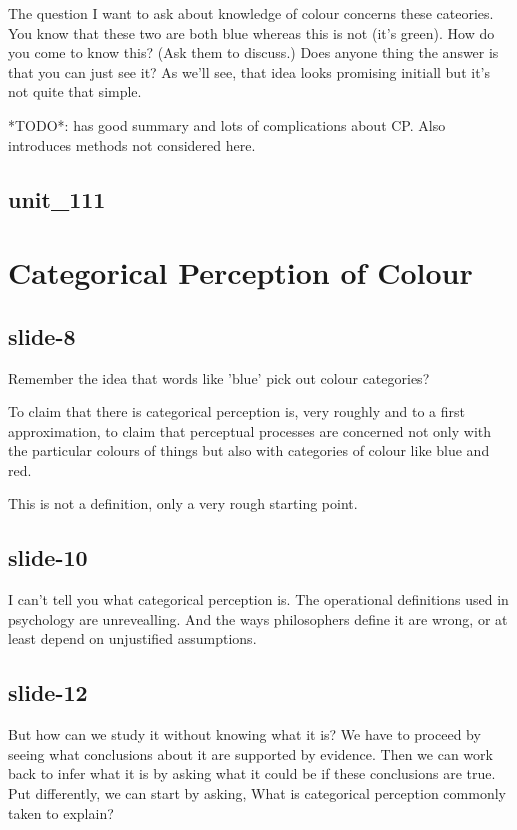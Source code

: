 \documentclass[12pt,\papersize]{extarticle}
\begin{document}
The question I want to ask about knowledge of colour concerns these cateories.
You know that these two are both blue whereas this is not (it's green).
How do you come to know this?
(Ask them to discuss.)
Does anyone thing the answer is that you can just see it?  As we'll see, that idea looks promising initiall but it's not quite that simple.

*TODO*: \citep{webster:2012_color} has good summary and lots of complications about CP.
Also introduces methods not considered here.

\subsection{unit\_111}


\section{Categorical Perception of Colour}

\subsection{slide-8}
Remember the idea that words like 'blue' pick out colour categories?

To claim that there is categorical perception is, very roughly and to a first approximation, to claim that perceptual processes are concerned not only with the particular colours of things but also with categories of colour like blue and red.

This is not a definition, only a very rough starting point.

\subsection{slide-10}
I can't tell you what categorical perception is.
The operational definitions used in psychology are unrevealling.
And the ways philosophers define it are wrong, or at least depend on unjustified
assumptions.

\subsection{slide-12}
But how can we study it without knowing what it is?
We have to proceed by seeing what conclusions about it are supported by evidence.
Then we can work back to infer what it is by asking what it could be if these
conclusions are true.
Put differently, we can start by asking, What is categorical perception commonly
taken to explain?
\end{document}
